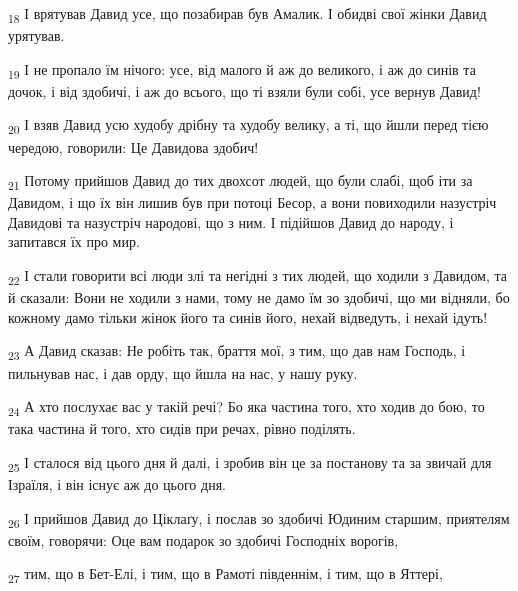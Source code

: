 \begin{tcolorbox}
\textsubscript{18} І врятував Давид усе, що позабирав був Амалик. І обидві свої жінки Давид урятував.
\end{tcolorbox}
\begin{tcolorbox}
\textsubscript{19} І не пропало їм нічого: усе, від малого й аж до великого, і аж до синів та дочок, і від здобичі, і аж до всього, що ті взяли були собі, усе вернув Давид!
\end{tcolorbox}
\begin{tcolorbox}
\textsubscript{20} І взяв Давид усю худобу дрібну та худобу велику, а ті, що йшли перед тією чередою, говорили: Це Давидова здобич!
\end{tcolorbox}
\begin{tcolorbox}
\textsubscript{21} Потому прийшов Давид до тих двохсот людей, що були слабі, щоб іти за Давидом, і що їх він лишив був при потоці Бесор, а вони повиходили назустріч Давидові та назустріч народові, що з ним. І підійшов Давид до народу, і запитався їх про мир.
\end{tcolorbox}
\begin{tcolorbox}
\textsubscript{22} І стали говорити всі люди злі та негідні з тих людей, що ходили з Давидом, та й сказали: Вони не ходили з нами, тому не дамо їм зо здобичі, що ми відняли, бо кожному дамо тільки жінок його та синів його, нехай відведуть, і нехай ідуть!
\end{tcolorbox}
\begin{tcolorbox}
\textsubscript{23} А Давид сказав: Не робіть так, браття мої, з тим, що дав нам Господь, і пильнував нас, і дав орду, що йшла на нас, у нашу руку.
\end{tcolorbox}
\begin{tcolorbox}
\textsubscript{24} А хто послухає вас у такій речі? Бо яка частина того, хто ходив до бою, то така частина й того, хто сидів при речах, рівно поділять.
\end{tcolorbox}
\begin{tcolorbox}
\textsubscript{25} І сталося від цього дня й далі, і зробив він це за постанову та за звичай для Ізраїля, і він існує аж до цього дня.
\end{tcolorbox}
\begin{tcolorbox}
\textsubscript{26} І прийшов Давид до Ціклаґу, і послав зо здобичі Юдиним старшим, приятелям своїм, говорячи: Оце вам подарок зо здобичі Господніх ворогів,
\end{tcolorbox}
\begin{tcolorbox}
\textsubscript{27} тим, що в Бет-Елі, і тим, що в Рамоті південнім, і тим, що в Яттері,
\end{tcolorbox}
